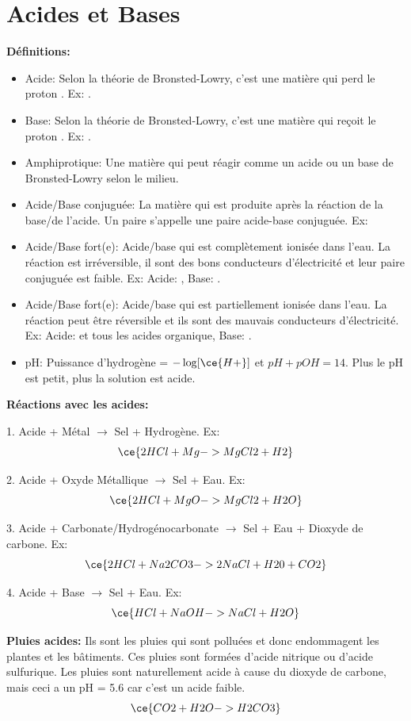 \documentclass[french, a4paper, 12pt]{article}
\newcommand*\cec[1]{\cesplit{{\,\ }{\0}}{#1}} %
\begin{document}
\section{Acides et Bases}
\textbf{Définitions:}
\begin{itemize}
\item Acide: Selon la théorie de Bronsted-Lowry, c'est une matière qui perd le proton . Ex: \cec{HCl, HCO3, H2SO4}.
\item Base: Selon la théorie de Bronsted-Lowry, c'est une matière qui reçoit le proton . Ex: \cec{NaOH, KOH, NH4OH}.
\item Amphiprotique: Une matière qui peut réagir comme un acide ou un base de Bronsted-Lowry selon le milieu.
\item Acide/Base conjuguée: La matière qui est produite après la réaction de la base/de l'acide. Un paire s'appelle une paire acide-base conjuguée. Ex: 
\item Acide/Base fort(e): Acide/base qui est complètement ionisée dans l'eau. La réaction est irréversible, il sont des bons conducteurs d'électricité et leur paire conjuguée est faible. Ex: Acide: , Base: .
\item Acide/Base fort(e): Acide/base qui est partiellement ionisée dans l'eau. La réaction peut être réversible et ils sont des mauvais conducteurs d'électricité. Ex: Acide:  et tous les acides organique, Base: .
\item pH: Puissance d'hydrogène = $-\log[\ce{H+}]$ et $pH + pOH = 14$. Plus le pH est petit, plus la solution est acide.
\end{itemize}

\vspace{0.5em}
\textbf{Réactions avec les acides:}

\begin{center}
1. Acide + Métal $\rightarrow$ Sel + Hydrogène. Ex:
\[
\ce{2HCl + Mg -> MgCl2 + H2}
\]

2. Acide + Oxyde Métallique $\rightarrow$ Sel + Eau. Ex:
\[
\ce{2HCl + MgO -> MgCl2 + H2O}
\]

3. Acide + Carbonate/Hydrogénocarbonate $\rightarrow$ Sel + Eau + Dioxyde de carbone. Ex:
\[
\ce{2HCl + Na2CO3 -> 2NaCl + H20 + CO2}
\]

4. Acide + Base $\rightarrow$ Sel + Eau. Ex:
\[
\ce{HCl + NaOH -> NaCl + H2O}
\]
\end{center}

\vspace{0.5em}
\textbf{Pluies acides:}
Ils sont les pluies qui sont polluées et donc endommagent les plantes et les bâtiments. Ces pluies sont formées d'acide nitrique ou d'acide sulfurique. Les pluies sont naturellement acide à cause du dioxyde de carbone, mais ceci a un pH = 5.6 car c'est un acide faible.
\[
\ce{CO2 + H2O -> H2CO3}
\]
\end{document}
